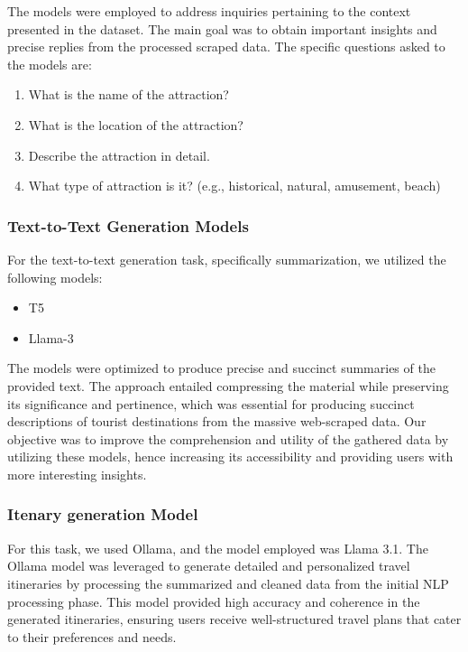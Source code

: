 \documentclass[conference]{IEEEtran}
\begin{document}
            The models were employed to address inquiries pertaining to the context presented in the dataset. The main goal was to obtain important insights and precise replies from the processed scraped data. The specific questions asked to the models are:

            \begin{tcolorbox}[linewidth=1pt, innerleftmargin=15pt, innerrightmargin=15pt, innertopmargin=15pt, innerbottommargin=15pt]
                \begin{enumerate}
                    \item What is the name of the attraction?
                    \item What is the location of the attraction?
                    \item Describe the attraction in detail.
                    \item What type of attraction is it? (e.g., historical, natural, amusement, beach)
                \end{enumerate}
            \end{tcolorbox}

        \subsubsection{Text-to-Text Generation Models}
            For the text-to-text generation task, specifically summarization, we utilized the following models:
            \begin{itemize}
                \item T5
                \item Llama-3
            \end{itemize}

            The models were optimized to produce precise and succinct summaries of the provided text. The approach entailed compressing the material while preserving its significance and pertinence, which was essential for producing succinct descriptions of tourist destinations from the massive web-scraped data.
            Our objective was to improve the comprehension and utility of the gathered data by utilizing these models, hence increasing its accessibility and providing users with more interesting insights.

         \subsubsection{Itenary generation Model}
            For this task, we used Ollama, and the model employed was Llama 3.1. The Ollama model was leveraged to generate detailed and personalized travel itineraries by processing the summarized and cleaned data from the initial NLP processing phase. This model provided high accuracy and coherence in the generated itineraries, ensuring users receive well-structured travel plans that cater to their preferences and needs.
\end{document}
